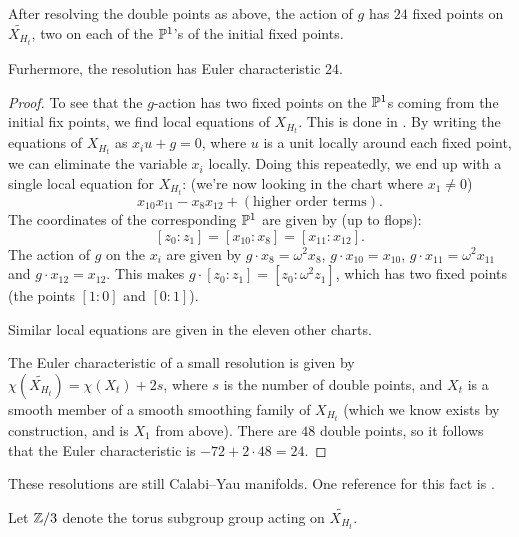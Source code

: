 \begin{lemma}
After resolving the double points as above, the action of $g$ has $24$ fixed points on $\widetilde{X_{H_t}}$, two on each of the $\P^1$'s of the initial fixed points.

Furhermore, the resolution has Euler characteristic $24$.
\end{lemma}
\begin{proof}
To see that the $g$-action has two fixed points on the $\P^1$s coming from the initial fix points, we find local equations of $X_{H_t}$. This is done in \MM. By writing the equations of $X_{H_t}$ as $x_iu+g=0$, where $u$ is a unit locally around each fixed point, we can eliminate the variable $x_i$ locally. Doing this repeatedly, we end up with a single local equation for $X_{H_t}$: (we're now looking in the chart where $x_1 \neq 0$)
\[
x_{10}x_{11}-x_8x_{12} + (\text{higher order terms}).
\]
The coordinates of the corresponding $\P^1$ are given by (up to flops):
\[
[z_0:z_1] = [x_{10}:x_8] = [x_{11}:x_{12}].
\]
The action of $g$ on the $x_i$ are given by $g \cdot x_8 = \omega^2 x_8$, $g \cdot x_{10} = x_{10}$, $g \cdot x_{11} = \omega^2 x_{11}$ and $g \cdot x_{12} = x_{12}$. This makes $ g \cdot [z_0:z_1] = [z_0:\omega^2 z_1]$, which has two fixed points (the points $[1:0]$ and $[0:1]$).

Similar local equations are given in the eleven other charts.

The Euler characteristic of a small resolution is given by $\chi(\widetilde{X_{H_t}}) = \chi(X_t) + 2s$, where $s$ is the number of double points, and $X_t$ is a smooth member of a smooth smoothing family of $X_{H_t}$ (which we know exists by construction, and is $X_1$ from above). There are $48$ double points, so it follows that the Euler characteristic is $-72+2 \cdot 48 = 24$.
\end{proof}

These resolutions are still Calabi--Yau manifolds. One reference for this fact is \cite{clemens_double}. 

Let $\Z/3$ denote the torus subgroup group acting on $\widetilde{X_{H_t}}$. 

